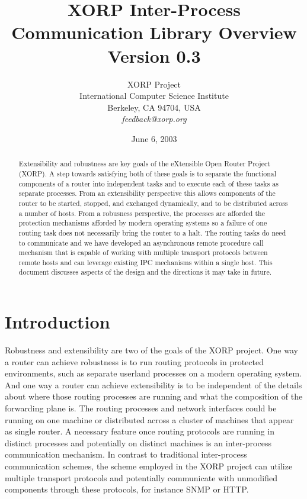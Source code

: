 \documentclass[11pt]{article}
\title{
XORP Inter-Process Communication Library Overview \\
\vspace{1ex} Version 0.3
}
\author{ XORP Project					\\
	 International Computer Science Institute	\\
	 Berkeley, CA 94704, USA			\\
	 {\it feedback@xorp.org}
}
\date{June 6, 2003}
\begin{document}
\maketitle
\begin{abstract}

Extensibility and robustness are key goals of the eXtensible Open
Router Project (XORP).  A step towards satisfying both of these goals
is to separate the functional components of a router into independent
tasks and to execute each of these tasks as separate processes.  From
an extensibility perspective this allows components of the router to
be started, stopped, and exchanged dynamically, and to be distributed
across a number of hosts.  From a robusness perspective, the processes
are afforded the protection mechanisms afforded by modern operating
systems so a failure of one routing task does not necessarily bring
the router to a halt. The routing tasks do need to communicate and we
have developed an asynchronous remote procedure call mechanism that is
capable of working with multiple transport protocols between remote
hosts and can leverage existing IPC mechanisms within a single
host. This document discusses aspects of the design and the directions
it may take in future.
\end{abstract}

\section{Introduction}

Robustness and extensibility are two of the goals of the XORP project.
One way a router can achieve robustness is to run routing protocols in
protected environments, such as separate userland processes on a
modern operating system.  And one way a router can achieve
extensibility is to be independent of the details about where those
routing processes are running and what the composition of the
forwarding plane is.  The routing processes and network interfaces
could be running on one machine or distributed across a cluster of
machines that appear as single router.  A necessary feature once
routing protocols are running in distinct processes and potentially on
distinct machines is an inter-process communication mechanism.  In
contrast to traditional inter-process communication schemes, the
scheme employed in the XORP project can utilize multiple transport
protocols and potentially communicate with unmodified components
through these protocols, for instance SNMP or HTTP.
\end{document}
